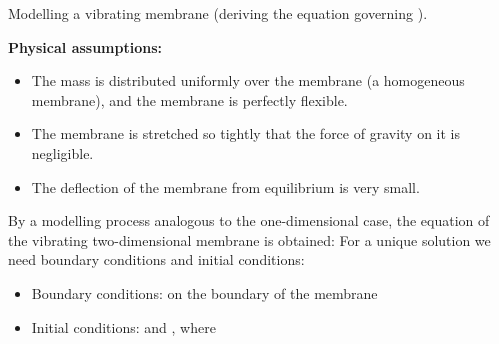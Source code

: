 \EMhold


\begin{EMunit}

Modelling a vibrating membrane (deriving the equation governing ).

\textbf{Physical assumptions:}

\begin{itemize}
\tightlist
\item
  The mass is distributed uniformly over the membrane (a homogeneous membrane), and the membrane is perfectly flexible.
\item
  The membrane is stretched so tightly that the force of gravity on it is negligible.
\item
  The deflection of the membrane from equilibrium is very small.
\end{itemize}


\end{EMunit}

\begin{EMunit}

By a modelling process analogous to the one-dimensional case, the equation of the vibrating two-dimensional membrane is obtained:
For a unique solution we need boundary conditions and initial conditions:

\begin{itemize}
\tightlist
\item
  Boundary conditions:  on the boundary of the membrane
\item
  Initial conditions:  and , where 
\end{itemize}

\end{EMunit}

\EMhold


